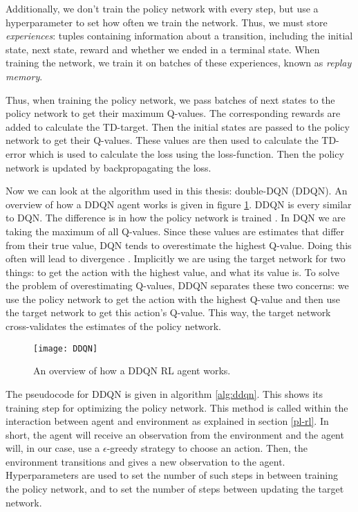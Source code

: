 Additionally, we don't train the policy network with every step, but use a hyperparameter to set how often we train the network. Thus, we must store \emph{experiences}: tuples containing information about a transition, including the initial state, next state, reward and whether we ended in a terminal state. When training the network, we train it on batches of these experiences, known as \emph{replay memory}. 

Thus, when training the policy network, we pass batches of next states to the policy network to get their maximum Q-values. The corresponding rewards are added to calculate the TD-target. Then the initial states are passed to the policy network to get their Q-values. These values are then used to calculate the TD-error which is used to calculate the loss using the loss-function. Then the policy network is updated by backpropagating the loss.

Now we can look at the algorithm used in this thesis: double-DQN (DDQN). An overview of how a DDQN agent works is given in figure \ref{fig:ddqn}. DDQN is every similar to DQN. The difference is in how the policy network is trained \cite{ddqn}. In DQN we are taking the maximum of all Q-values. Since these values are estimates that differ from their true value, DQN tends to overestimate the highest Q-value. Doing this often will lead to divergence \cite[p. 293-297]{grokking}. Implicitly we are using the target network for two things: to get the action with the highest value, and what its value is. To solve the problem of overestimating Q-values, DDQN separates these two concerns: we use the policy network to get the action with the highest Q-value and then use the target network to get this action's Q-value. This way, the target network cross-validates the estimates of the policy network.

\begin{figure}[h]
    \centering
    \texttt{[image: DDQN]}
    \caption{An overview of how a DDQN RL agent works.}
    \label{fig:ddqn}
\end{figure}

The pseudocode for DDQN is given in algorithm \ref{alg:ddqn}. This shows its training step for optimizing the policy network. This method is called within the interaction between agent and environment as explained in section \ref{pl-rl}. In short, the agent will receive an observation from the environment and the agent will, in our case, use a {$\epsilon$}-greedy strategy to choose an action. Then, the environment transitions and gives a new observation to the agent. Hyperparameters are used to set the number of such steps in between training the policy network, and to set the number of steps between updating the target network.

